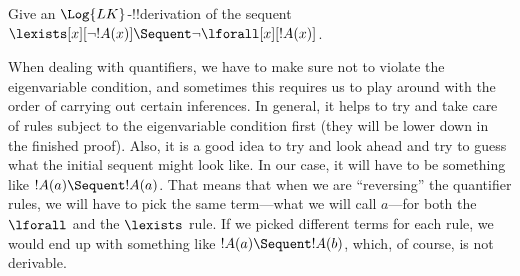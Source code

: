 

\begin{ex}
Give an $\Log{LK}$-!!{derivation} of the sequent $\lexists[x][\lnot !A(x)]
\Sequent \lnot \lforall[x][!A(x)]$.

When dealing with quantifiers, we have to make sure not to violate the
eigenvariable condition, and sometimes this requires us to play around
with the order of carrying out certain inferences. In general, it
helps to try and take care of rules subject to the eigenvariable
condition first (they will be lower down in the finished proof). Also,
it is a good idea to try and look ahead and try to guess what the
initial sequent might look like. In our case, it will have to be
something like $!A(a) \Sequent !A(a)$. That means that when we are
``reversing'' the quantifier rules, we will have to pick the same
term---what we will call $a$---for both the $\lforall$ and the
$\lexists$ rule. If we picked different terms for each rule, we would
end up with something like $!A(a) \Sequent !A(b)$, which, of course,
is not derivable.


\end{ex}
